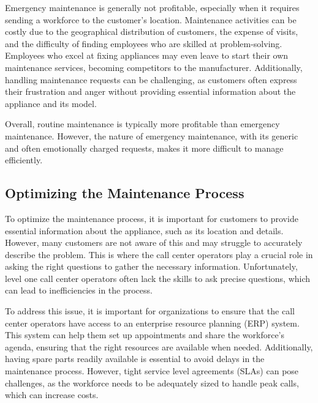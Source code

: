 
Emergency maintenance is generally not profitable, especially when it
requires sending a workforce to the customer's location. Maintenance
activities can be costly due to the geographical distribution of
customers, the expense of visits, and the difficulty of finding
employees who are skilled at problem-solving. Employees who excel at
fixing appliances may even leave to start their own maintenance
services, becoming competitors to the manufacturer. Additionally,
handling maintenance requests can be challenging, as customers often
express their frustration and anger without providing essential
information about the appliance and its model.

Overall, routine maintenance is typically more profitable than emergency
maintenance. However, the nature of emergency maintenance, with its
generic and often emotionally charged requests, makes it more difficult
to manage efficiently.

\subsection{Optimizing the Maintenance
    Process}\label{optimizing-the-maintenance-process}

To optimize the maintenance process, it is important for customers to provide essential information about the appliance, such as its location and details. However, many customers are not aware of this and may struggle to accurately describe the problem. This is where the call center operators play a crucial role in asking the right questions to gather the necessary information. Unfortunately, level one call center operators often lack the skills to ask precise questions, which can lead to inefficiencies in the process.


To address this issue, it is important for organizations to ensure that the call center operators have access to an enterprise resource planning (ERP) system. This system can help them set up appointments and share the workforce's agenda, ensuring that the right resources are available when needed. Additionally, having spare parts readily available is essential to avoid delays in the maintenance process. However, tight service level agreements (SLAs) can pose challenges, as the workforce needs to be adequately sized to handle peak calls, which can increase costs.

